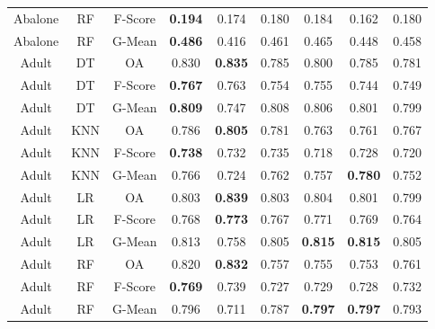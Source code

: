 \begin{longtable}{ccccccccc}
           Abalone &         RF & F-Score & \textbf{0.194} &          0.174 &          0.180 &          0.184 &          0.162 &          0.180 \\
           Abalone &         RF &  G-Mean & \textbf{0.486} &          0.416 &          0.461 &          0.465 &          0.448 &          0.458 \\
             Adult &         DT &      OA &          0.830 & \textbf{0.835} &          0.785 &          0.800 &          0.785 &          0.781 \\
             Adult &         DT & F-Score & \textbf{0.767} &          0.763 &          0.754 &          0.755 &          0.744 &          0.749 \\
             Adult &         DT &  G-Mean & \textbf{0.809} &          0.747 &          0.808 &          0.806 &          0.801 &          0.799 \\
             Adult &        KNN &      OA &          0.786 & \textbf{0.805} &          0.781 &          0.763 &          0.761 &          0.767 \\
             Adult &        KNN & F-Score & \textbf{0.738} &          0.732 &          0.735 &          0.718 &          0.728 &          0.720 \\
             Adult &        KNN &  G-Mean &          0.766 &          0.724 &          0.762 &          0.757 & \textbf{0.780} &          0.752 \\
             Adult &         LR &      OA &          0.803 & \textbf{0.839} &          0.803 &          0.804 &          0.801 &          0.799 \\
             Adult &         LR & F-Score &          0.768 & \textbf{0.773} &          0.767 &          0.771 &          0.769 &          0.764 \\
             Adult &         LR &  G-Mean &          0.813 &          0.758 &          0.805 & \textbf{0.815} & \textbf{0.815} &          0.805 \\
             Adult &         RF &      OA &          0.820 & \textbf{0.832} &          0.757 &          0.755 &          0.753 &          0.761 \\
             Adult &         RF & F-Score & \textbf{0.769} &          0.739 &          0.727 &          0.729 &          0.728 &          0.732 \\
             Adult &         RF &  G-Mean &          0.796 &          0.711 &          0.787 & \textbf{0.797} & \textbf{0.797} &          0.793 \\

\end{longtable}
